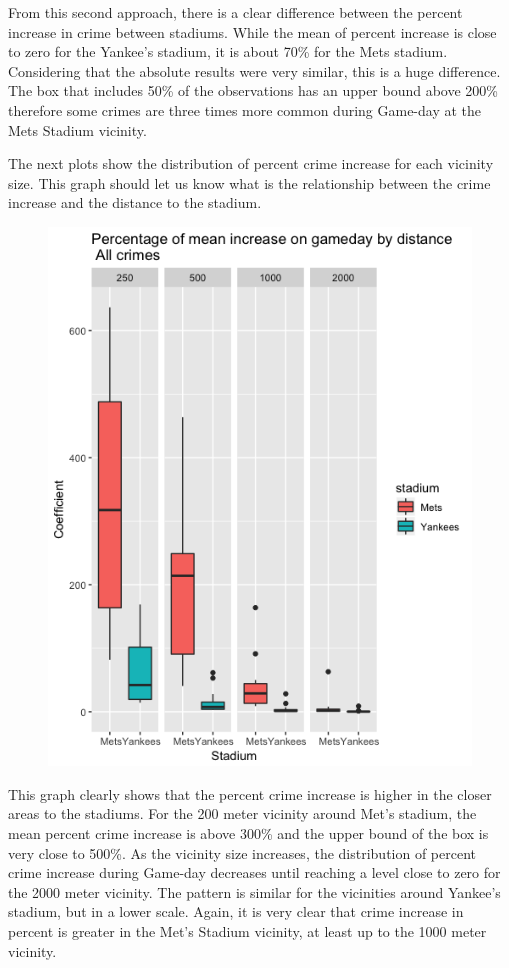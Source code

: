 \documentclass{article}
\begin{document}
From this second approach, there is a clear difference between the percent increase in crime between stadiums. While the mean of percent increase is close to zero for the Yankee's stadium, it is about 70\% for the Mets stadium. Considering that the absolute results were very similar, this is a huge difference.  The box that includes 50\% of the observations has an upper bound above 200\% therefore some crimes are three times more common  during Game-day at the Mets Stadium vicinity. 

The next plots show the  distribution of  percent crime increase for each vicinity size. This graph should let us know what is the relationship between the crime increase and the distance to the stadium.

\begin{figure}[H]
\centering
\includegraphics[scale=0.45]{percent_box_4.png}
\end{figure}

This graph clearly shows that the percent crime increase is higher in the closer areas to the stadiums. For the 200 meter vicinity around Met's stadium, the mean percent crime increase is above 300\% and the upper bound of the box is very close to 500\%. As the vicinity size increases, the distribution of percent crime increase during Game-day decreases until reaching a level close to zero for the 2000 meter vicinity. The pattern is similar for the vicinities around Yankee's stadium, but in a lower scale. Again, it is very clear that crime increase in percent is greater in the Met's Stadium vicinity, at least up to the 1000 meter vicinity.
\end{document}
